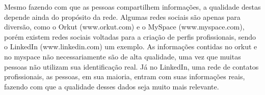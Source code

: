 Mesmo fazendo com que as pessoas compartilhem informações, a qualidade destas depende ainda do propósito da rede. Algumas redes sociais são apenas para diversão, como o Orkut (www.orkut.com) e o MySpace (www.myspace.com), porém existem redes sociais voltadas para a criação de perfis profissionais, sendo o LinkedIn (www.linkedin.com) um exemplo. As informações contidas no orkut e no myspace não necessariamente são de alta qualidade, uma vez que muitas pessoas não utilizam sua identificação real. Já no LinkedIn, uma rede de contatos profissionais, as pessoas, em sua maioria, entram com suas informações reais, fazendo com que a qualidade desses dados seja muito mais relevante.





